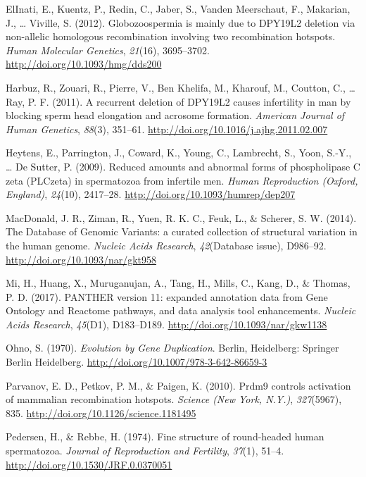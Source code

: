 \documentclass[12pt,twoside]{reedthesis}
\theoremstyle{definition}
\theoremstyle{definition}
\theoremstyle{remark}
\begin{document}
  \hypertarget{ref-ElInati2012}{}
  ElInati, E., Kuentz, P., Redin, C., Jaber, S., Vanden Meerschaut, F.,
  Makarian, J., \ldots{} Viville, S. (2012). Globozoospermia is mainly due
  to DPY19L2 deletion via non-allelic homologous recombination involving
  two recombination hotspots. \emph{Human Molecular Genetics},
  \emph{21}(16), 3695--3702. \url{http://doi.org/10.1093/hmg/dds200}
  
  \hypertarget{ref-Harbuz2011}{}
  Harbuz, R., Zouari, R., Pierre, V., Ben Khelifa, M., Kharouf, M.,
  Coutton, C., \ldots{} Ray, P. F. (2011). A recurrent deletion of DPY19L2
  causes infertility in man by blocking sperm head elongation and acrosome
  formation. \emph{American Journal of Human Genetics}, \emph{88}(3),
  351--61. \url{http://doi.org/10.1016/j.ajhg.2011.02.007}
  
  \hypertarget{ref-Heytens2009}{}
  Heytens, E., Parrington, J., Coward, K., Young, C., Lambrecht, S., Yoon,
  S.-Y., \ldots{} De Sutter, P. (2009). Reduced amounts and abnormal forms
  of phospholipase C zeta (PLCzeta) in spermatozoa from infertile men.
  \emph{Human Reproduction (Oxford, England)}, \emph{24}(10), 2417--28.
  \url{http://doi.org/10.1093/humrep/dep207}
  
  \hypertarget{ref-MacDonald2014}{}
  MacDonald, J. R., Ziman, R., Yuen, R. K. C., Feuk, L., \& Scherer, S. W.
  (2014). The Database of Genomic Variants: a curated collection of
  structural variation in the human genome. \emph{Nucleic Acids Research},
  \emph{42}(Database issue), D986--92.
  \url{http://doi.org/10.1093/nar/gkt958}
  
  \hypertarget{ref-Mi2017}{}
  Mi, H., Huang, X., Muruganujan, A., Tang, H., Mills, C., Kang, D., \&
  Thomas, P. D. (2017). PANTHER version 11: expanded annotation data from
  Gene Ontology and Reactome pathways, and data analysis tool
  enhancements. \emph{Nucleic Acids Research}, \emph{45}(D1), D183--D189.
  \url{http://doi.org/10.1093/nar/gkw1138}
  
  \hypertarget{ref-Ohno1970}{}
  Ohno, S. (1970). \emph{Evolution by Gene Duplication}. Berlin,
  Heidelberg: Springer Berlin Heidelberg.
  \url{http://doi.org/10.1007/978-3-642-86659-3}
  
  \hypertarget{ref-Parvanov2010}{}
  Parvanov, E. D., Petkov, P. M., \& Paigen, K. (2010). Prdm9 controls
  activation of mammalian recombination hotspots. \emph{Science (New York,
  N.Y.)}, \emph{327}(5967), 835.
  \url{http://doi.org/10.1126/science.1181495}
  
  \hypertarget{ref-Pedersen1974}{}
  Pedersen, H., \& Rebbe, H. (1974). Fine structure of round-headed human
  spermatozoa. \emph{Journal of Reproduction and Fertility}, \emph{37}(1),
  51--4. \url{http://doi.org/10.1530/JRF.0.0370051}
  
\end{document}
